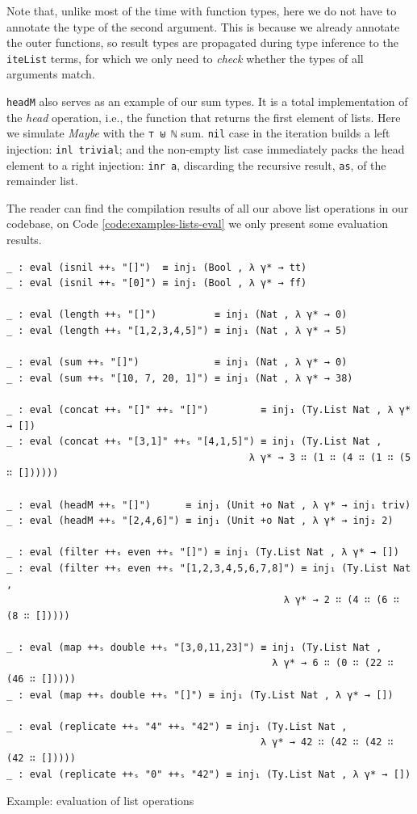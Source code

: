 Note that, unlike most of the time with function types, here we do not have to annotate the type of the second argument. This is because we already annotate the outer functions, so result types are propagated during type inference to the \verb$iteList$ terms, for which we only need to \textit{check} whether the types of all arguments match.

\verb$headM$ also serves as an example of our sum types. It is a total implementation of the \textit{head} operation, i.e., the function that returns the first element of lists. Here we simulate \textit{Maybe} with the \verb$⊤ ⊎ ℕ$ sum. \verb$nil$ case in the iteration builds a left injection: \verb$inl trivial$; and the non-empty list case immediately packs the head element to a right injection: \verb$inr a$, discarding the recursive result, \verb$as$, of the remainder list.

The reader can find the compilation results of all our above list operations in our codebase, on Code \ref{code:examples-lists-eval} we only present some evaluation results.

\begin{listing}[H]
\begin{verbatim}
_ : eval (isnil ++ₛ "[]")  ≡ inj₁ (Bool , λ γ* → tt)
_ : eval (isnil ++ₛ "[0]") ≡ inj₁ (Bool , λ γ* → ff)

_ : eval (length ++ₛ "[]")          ≡ inj₁ (Nat , λ γ* → 0)
_ : eval (length ++ₛ "[1,2,3,4,5]") ≡ inj₁ (Nat , λ γ* → 5)

_ : eval (sum ++ₛ "[]")             ≡ inj₁ (Nat , λ γ* → 0)
_ : eval (sum ++ₛ "[10, 7, 20, 1]") ≡ inj₁ (Nat , λ γ* → 38)

_ : eval (concat ++ₛ "[]" ++ₛ "[]")         ≡ inj₁ (Ty.List Nat , λ γ* → [])
_ : eval (concat ++ₛ "[3,1]" ++ₛ "[4,1,5]") ≡ inj₁ (Ty.List Nat ,
                                          λ γ* → 3 ∷ (1 ∷ (4 ∷ (1 ∷ (5 ∷ [])))))

_ : eval (headM ++ₛ "[]")      ≡ inj₁ (Unit +o Nat , λ γ* → inj₁ triv)
_ : eval (headM ++ₛ "[2,4,6]") ≡ inj₁ (Unit +o Nat , λ γ* → inj₂ 2)

_ : eval (filter ++ₛ even ++ₛ "[]") ≡ inj₁ (Ty.List Nat , λ γ* → [])
_ : eval (filter ++ₛ even ++ₛ "[1,2,3,4,5,6,7,8]") ≡ inj₁ (Ty.List Nat ,
                                                λ γ* → 2 ∷ (4 ∷ (6 ∷ (8 ∷ []))))

_ : eval (map ++ₛ double ++ₛ "[3,0,11,23]") ≡ inj₁ (Ty.List Nat ,
                                              λ γ* → 6 ∷ (0 ∷ (22 ∷ (46 ∷ []))))
_ : eval (map ++ₛ double ++ₛ "[]") ≡ inj₁ (Ty.List Nat , λ γ* → [])

_ : eval (replicate ++ₛ "4" ++ₛ "42") ≡ inj₁ (Ty.List Nat ,
                                            λ γ* → 42 ∷ (42 ∷ (42 ∷ (42 ∷ []))))
_ : eval (replicate ++ₛ "0" ++ₛ "42") ≡ inj₁ (Ty.List Nat , λ γ* → [])
\end{verbatim}
\caption{Example: evaluation of list operations}
\label{code:examples-lists-eval}
\end{listing}

